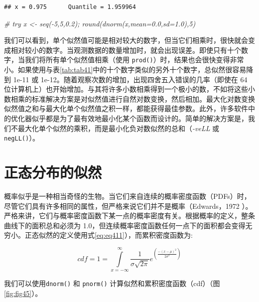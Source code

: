 \documentclass[
  lang=cn,
  11pt,
  scheme=chinese,
  chinesefont=nofont,
  citestyle=gb7714-2015,
  bibstyle=gb7714-2015]{elegantbook}
\newenvironment{Shaded}{\begin{snugshade}}{\end{snugshade}}
\newcommand{\CommentTok}[1]{\textcolor[rgb]{0.56,0.35,0.01}{\textit{#1}}}
\begin{document}
\begin{verbatim}
## x = 0.975      Quantile = 1.959964
\end{verbatim}

\begin{Shaded}
\begin{Highlighting}[]
 \CommentTok{\# try x \textless{}{-} seq({-}5,5,0.2); round(dnorm(x,mean=0.0,sd=1.0),5)  }
\end{Highlighting}
\end{Shaded}

我们可以看到，单个似然值可能是相对较大的数字，但当它们相乘时，很快就会变成相对较小的数字。当观测数据的数量增加时，就会出现误差。即使只有十个数字，当我们将所有单个似然值相乘（使用 \texttt{prod()}）时，结果也会很快变得非常小。如果使用与表\ref{tab:tab41}中的十个数字类似的另外十个数字，总似然很容易降到 1e-11 或 1e-12。随着观察次数的增加，出现四舍五入错误的几率（即使在 64 位计算机上）也开始增加。与其将许多小数相乘得到一个极小的数，不如将这些小数相乘的标准解决方案是对似然值进行自然对数变换，然后相加。最大化对数变换似然值之和与最大化单个似然值之积一样，都能获得最佳参数。此外，许多软件中的优化器似乎都是为了最有效地最小化某个函数而设计的。简单的解决方案是，我们不最大化单个似然的乘积，而是最小化负对数似然的总和（\emph{-veLL} 或 \texttt{negLL()}）。

\section{正态分布的似然}\label{ux6b63ux6001ux5206ux5e03ux7684ux4f3cux7136}

概率似乎是一种相当奇怪的生物。当它们来自连续的概率密度函数（PDFs）时，尽管它们具有许多相同的属性，但严格来说它们并不是概率（Edwards，1972 ）。严格来讲，它们与概率密度函数下某一点的概率密度有关。根据概率的定义，整条曲线下的面积总和必须为 1.0，但连续概率密度函数任何一点下的面积都会变得无穷小。正态似然的定义使用式\eqref{eq:eq411}），而累积密度函数为:

\begin{equation}  
{cdf}=1=\int\limits_{x=-\infty }^{\infty }{\frac{1}{\sigma \sqrt{2\pi }}}{{e}^{\left( \frac{-{{\left( x-\mu  \right)}^{2}}}{2{{\sigma }^{2}}} \right)}}  
\label{eq:eq412}  
\end{equation}

我们可以使用\texttt{dnorm()} 和 \texttt{pnorm()} 计算似然和累积密度函数（cdf）（图\ref{fig:fig45}）。
\end{document}
